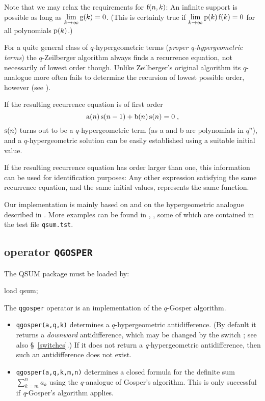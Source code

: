 Note that we may relax the requirements for ${\mathrm f}(n,k)$:
An infinite support is possible as long as 
$\lim\limits_{k\rightarrow\infty}{{\mathrm g}(k)}=0$. 
(This is certainly true if 
$\lim\limits_{k\rightarrow\infty}{{\mathrm p}(k)\,{\mathrm f}(k)}=0$ for
all polynomials ${\mathrm p}(k)$.)

For a quite general class of $q$-hypergeometric terms 
({\sl proper q-hypergeometric terms}) the $q$-Zeilberger algorithm
always finds a recurrence equation, not necessarily of lowest
order though. Unlike Zeilberger's original algorithm its
$q$-analogue more often fails to determine the recursion of
lowest possible order, however (see \cite{PauleRiese:95}).

If the resulting recurrence equation is of first order
\[
	{\mathrm a}(n)\,{\mathrm s}(n-1)+{\mathrm b}(n)\,{\mathrm s}(n)=0
\;,
\]
${\mathrm s}(n)$ turns out to be a $q$-hypergeometric term
(as a and b are polynomials in $q^n$),
and a $q$-hypergeometric solution can be easily established using a 
suitable initial value.

If the resulting recurrence equation has order larger than one, 
this information can be used for identification purposes:
Any other expression satisfying the same recurrence equation, and the same
initial values, represents the same function.

Our implementation is mainly based on \cite{Koornwinder:93} and on the
hypergeometric analogue described in \cite{Koepf:95e}. 
More examples can be found in \cite{GasperRahman:90}, \cite{Gasper:95},
some of which are contained in the test file 
\texttt{qsum.tst}.


\subsection{\REDUCE{} operator \texttt{QGOSPER}}
\label{reduce_qgosper}

The QSUM package must be loaded by:

\begin{redoutput}
\redprompt load qsum;
\end{redoutput}
The \texttt{qgosper} operator is an implementation of the $q$-Gosper
algorithm.
\begin{itemize}
	\item \texttt{qgosper(a,q,k)} determines a $q$-hypergeometric
		antidifference. (By default it returns a \textsl{downward}
		antidifference, which may be changed by the switch 
		; see also 
		\S~\ref{switches}.)
		If it does not return a \textsl{q}-hypergeometric antidifference,
		then such an antidifference does not exist.
	\item \texttt{qgosper(a,q,k,m,n)} determines a closed formula
		for the definite sum $\sum\limits_{k=m}^n a_k$ using the
		$q$-analogue of Gosper's algorithm. 
		This is only successful if \textsl{q}-Gosper's algorithm applies.
\end{itemize}

